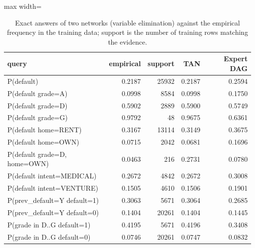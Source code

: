 \begin{table}[H]
\centering
\small
\begin{adjustbox}{max width=\linewidth}
\begin{tabular}{lrrrr}
\toprule
query & empirical & support & TAN & Expert DAG \\
\midrule
P(default) & 0.2187 & 25932 & 0.2187 & 0.2594 \\
P(default \textbar{} grade=A) & 0.0998 & 8584 & 0.0998 & 0.1750 \\
P(default \textbar{} grade=D) & 0.5902 & 2889 & 0.5900 & 0.5749 \\
P(default \textbar{} grade=G) & 0.9792 & 48 & 0.9675 & 0.6361 \\
P(default \textbar{} home=RENT) & 0.3167 & 13114 & 0.3149 & 0.3675 \\
P(default \textbar{} home=OWN) & 0.0715 & 2042 & 0.0681 & 0.1696 \\
P(default \textbar{} grade=D, home=OWN) & 0.0463 & 216 & 0.2731 & 0.0780 \\
P(default \textbar{} intent=MEDICAL) & 0.2672 & 4842 & 0.2672 & 0.3008 \\
P(default \textbar{} intent=VENTURE) & 0.1505 & 4610 & 0.1506 & 0.1901 \\
P(prev\_default=Y \textbar{} default=1) & 0.3063 & 5671 & 0.3064 & 0.2685 \\
P(prev\_default=Y \textbar{} default=0) & 0.1404 & 20261 & 0.1404 & 0.1445 \\
P(grade in D..G \textbar{} default=1) & 0.4195 & 5671 & 0.4196 & 0.3408 \\
P(grade in D..G \textbar{} default=0) & 0.0746 & 20261 & 0.0747 & 0.0832 \\
\bottomrule
\end{tabular}
\end{adjustbox}
\caption{Exact answers of two networks (variable elimination) against the empirical frequency in the training data; support is the number of training rows matching the evidence.}
\label{tab:bn_queries}
\end{table}
